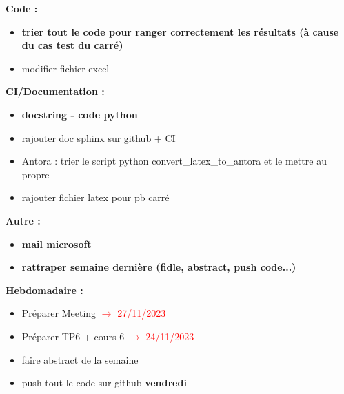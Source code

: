 \textbf{Code :}
\begin{itemize}[label=$\square$] 
	\item \textbf{trier tout le code pour ranger correctement les résultats (à cause du cas test du carré)}
	\item modifier fichier excel
\end{itemize}
\textbf{CI/Documentation :}
\begin{itemize}[label=$\square$] 
	\item \textbf{docstring - code python}
	\item rajouter doc sphinx sur github + CI
	\item Antora : trier le script python convert\_latex\_to\_antora et le mettre au propre
	\item rajouter fichier latex pour pb carré
\end{itemize}
\textbf{Autre :}
\begin{itemize}[label=$\square$] 
	\item \textbf{mail microsoft}
	\item \textbf{rattraper semaine dernière (fidle, abstract, push code...)}
\end{itemize}
\textbf{Hebdomadaire :}
\begin{itemize}[label=$\square$] 
	\item Préparer Meeting \textcolor{red}{$\rightarrow$ 27/11/2023}
	\item Préparer TP6 + cours 6 \textcolor{red}{$\rightarrow$ 24/11/2023}
	\item faire abstract de la semaine 
	\item push tout le code sur github \textbf{vendredi}
\end{itemize}